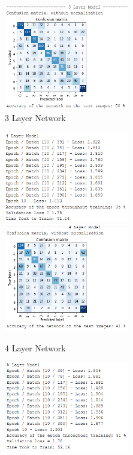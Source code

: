 \documentclass{article}
\begin{document}
\begin{figure}[h!]
\begin{subfigure}[t]{0.45\textwidth}
            \includegraphics[width=0.6\textwidth]{3Layer_cm}
            \caption{3 Layer Network}
        \end{subfigure}
        \begin{subfigure}[t]{0.45\textwidth}
            \centering
            \includegraphics[width=0.6\textwidth]{4Layer_train}
            \includegraphics[width=0.6\textwidth]{4Layer_cm}
            \caption{4 Layer Network}
        \end{subfigure}
        \begin{subfigure}[t]{0.45\textwidth}
            \centering
            \includegraphics[width=0.6\textwidth]{5Layer_train}

\end{subfigure}
\end{figure}
\end{document}
